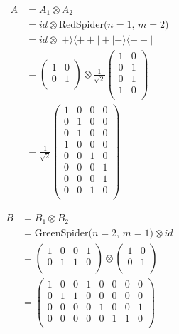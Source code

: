 \begin{align*}
    A & = A_1 \otimes A_2                           \\
      & = id \otimes \text{RedSpider($n=1$, $m=2$)} \\
      & =id    \otimes
    |+\rangle \langle ++| + |-\rangle \langle --|   \\
      & = \begin{pmatrix}
              1 & 0 \\
              0 & 1 \\
          \end{pmatrix}
    \otimes
    \frac{1}{\sqrt{2}}
    \begin{pmatrix}
        1 & 0 \\
        0 & 1 \\
        0 & 1 \\
        1 & 0 \\
    \end{pmatrix}                                  \\
      & = \frac{1}{\sqrt{2}}
    \begin{pmatrix}
        1 & 0 & 0 & 0 \\
        0 & 1 & 0 & 0 \\
        0 & 1 & 0 & 0 \\
        1 & 0 & 0 & 0 \\
        0 & 0 & 1 & 0 \\
        0 & 0 & 0 & 1 \\
        0 & 0 & 0 & 1 \\
        0 & 0 & 1 & 0 \\
    \end{pmatrix}
\end{align*}

\begin{align*}
    B & = B_1 \otimes B_2                             \\
      & = \text{GreenSpider($n=2$, $m=1$)} \otimes id \\
      & =
    \begin{pmatrix}
        1 & 0 & 0 & 1 \\
        0 & 1 & 1 & 0 \\
    \end{pmatrix}
    \otimes
    \begin{pmatrix}
        1 & 0 \\
        0 & 1 \\
    \end{pmatrix}                                    \\
      & = \begin{pmatrix}
              1 & 0 & 0 & 1 & 0 & 0 & 0 & 0 \\
              0 & 1 & 1 & 0 & 0 & 0 & 0 & 0 \\
              0 & 0 & 0 & 0 & 1 & 0 & 0 & 1 \\
              0 & 0 & 0 & 0 & 0 & 1 & 1 & 0 \\
          \end{pmatrix}
\end{align*}


